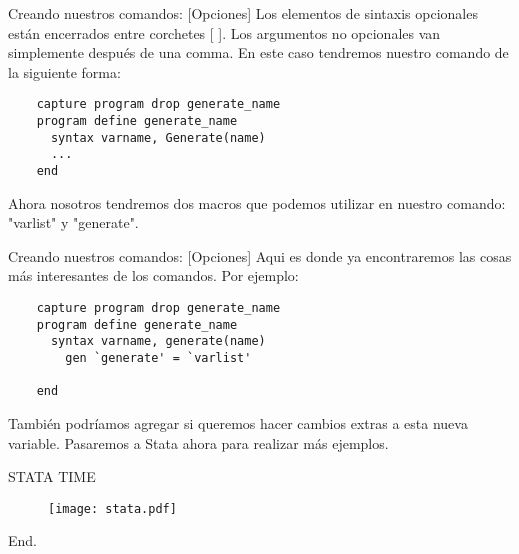 \documentclass[10pt, aspectratio=169, compress]{beamer}
\makeatletter
\def\beamer@writeslidentry@miniframesoff{%
	\expandafter\beamer@ifempty\expandafter{\beamer@framestartpage}{}%
	{%
		\clearpage\beamer@notesactions%
	}
}
\newcommand*{\miniframesoff}{\let\beamer@writeslidentry=\beamer@writeslidentry@miniframesoff}
\makeatother
\begin{document}
\begin{frame}[t, fragile]{Creando nuestros comandos: [Opciones]}
  Los elementos de sintaxis opcionales están encerrados entre corchetes [  ]. Los argumentos no opcionales van simplemente después de una comma.
  En este caso tendremos nuestro comando de la siguiente forma:
  \begin{lstlisting}
    capture program drop generate_name
    program define generate_name
      syntax varname, Generate(name)
      ...
    end
  \end{lstlisting}

  Ahora nosotros tendremos dos macros que podemos utilizar en nuestro comando: "varlist" y "generate".

\end{frame}

\begin{frame}[t, fragile]{Creando nuestros comandos: [Opciones]}
  Aqui es donde ya encontraremos las cosas más interesantes de los comandos. Por ejemplo:
  \begin{lstlisting}
    capture program drop generate_name
    program define generate_name
      syntax varname, generate(name)
        gen `generate' = `varlist'
        
    end
  \end{lstlisting}

  También podríamos agregar si queremos hacer cambios extras a esta nueva variable. Pasaremos a Stata ahora para realizar más ejemplos.
\end{frame}


\miniframesoff 	

\begin{frame}
	\begin{center}
	\LARGE STATA TIME
		\begin{figure}[H]
			\texttt{[image: stata.pdf]}
		\end{figure}
	\end{center}
\end{frame}
\begin{frame}
	End.
\end{frame}
\end{document}
